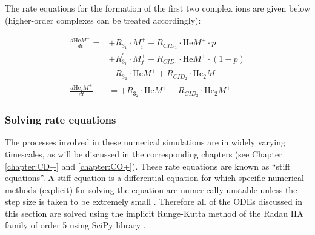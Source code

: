 The rate equations for the formation of the first two complex ions are given below (higher-order complexes can be treated accordingly):

\begin{equation*} \label{eq1}
    \begin{split}
        \frac{d\text{He}M^+}{dt} = 
            & +R_{3_1} \cdot M^+_i - R_{CID_1} \cdot \text{He}M^+ \cdot p \\
            &  +R^{'}_{3_1} \cdot M^+_f - R_{CID_1} \cdot \text{He}M^+ \cdot (1-p) \\
            & -R_{3_2} \cdot \text{He}M^+ + R_{CID_2} \cdot \text{He}_2M^+ \\
        \frac{d\text{He}_{2}M^+}{dt}
            &= +R_{3_2} \cdot \text{He}M^+ - R_{CID_2} \cdot \text{He}_{2}M^+
    \end{split}
\end{equation*}

\subsubsection{Solving rate equations}

The processes involved in these numerical simulations are in widely varying timescales, as will be discussed in the corresponding chapters (see Chapter \ref{chapter:CD+} and \ref{chapter:CO+}). These rate equations are known as \enquote{stiff equations}. A stiff equation is a differential equation for which specific numerical methods  (explicit) for solving the equation are numerically unstable unless the step size is taken to be extremely small \cite{hairer_solving_1991}.  Therefore all of the ODEs discussed in this section are solved using the implicit Runge-Kutta method of the Radau IIA family of order 5 \cite{hairer_implementation_1996} using SciPy library \cite{virtanen_scipy_2020}.